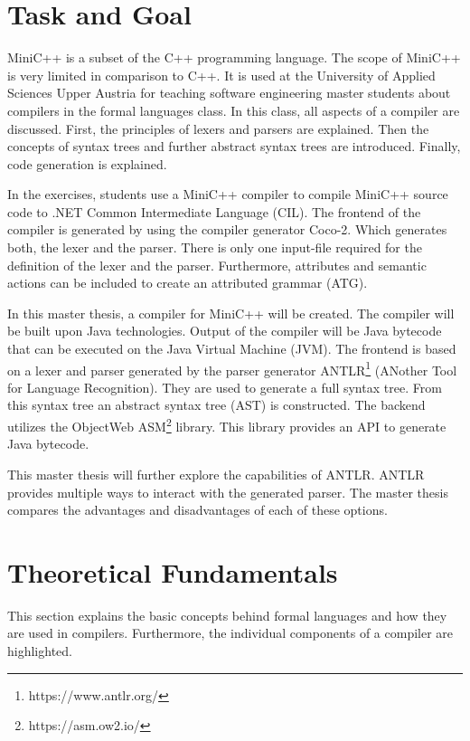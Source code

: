 \section{Task and Goal}

MiniC++ is a subset of the C++ programming language. The scope of MiniC++ is very limited in comparison to C++. It is used at the University of Applied Sciences Upper Austria for teaching software engineering master students about compilers in the formal languages class. In this class, all aspects of a compiler are discussed. First, the principles of lexers and parsers are explained. Then the concepts of syntax trees and further abstract syntax trees are introduced. Finally, code generation is explained. 

In the exercises, students use a MiniC++ compiler to compile MiniC++ source code to .NET Common Intermediate Language (CIL). The frontend of the compiler is generated by using the compiler generator Coco-2. Which generates both, the lexer and the parser. There is only one input-file required for the definition of the lexer and the parser. Furthermore, attributes and semantic actions can be included to create an attributed grammar (ATG). 

In this master thesis, a compiler for MiniC++ will be created. The compiler will be built upon Java technologies. Output of the compiler will be Java bytecode that can be executed on the Java Virtual Machine (JVM). The frontend is based on a lexer and parser generated by the parser generator ANTLR\footnote{https://www.antlr.org/} (ANother Tool for Language Recognition). They are used to generate a full syntax tree. From this syntax tree an abstract syntax tree (AST) is constructed. The backend utilizes the ObjectWeb ASM\footnote{https://asm.ow2.io/} library. This library provides an API to generate Java bytecode. 

This master thesis will further explore the capabilities of ANTLR. ANTLR provides multiple ways to interact with the generated parser. The master thesis compares the advantages and disadvantages of each of these options.

\section{Theoretical Fundamentals}

This section explains the basic concepts behind formal languages and how they are used in compilers. Furthermore, the individual components of a compiler are highlighted. 

